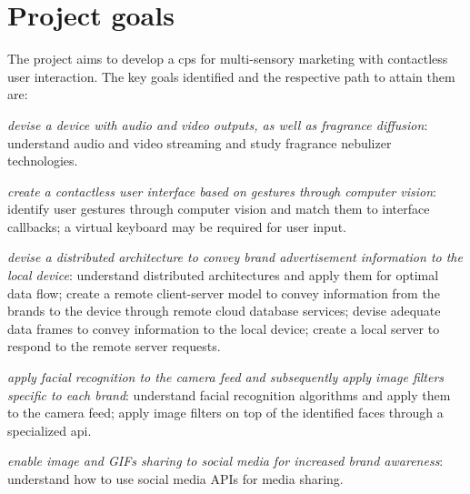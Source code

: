 \section{Project goals}%
\label{sec:project-goals}
The project aims to develop a \gls{cps} for multi-sensory marketing with
contactless user interaction. The key goals identified and the respective path
to attain them are:
\begin{enum-c}
\item \emph{devise a device with audio and video outputs, as well as fragrance
    diffusion}: understand audio and video streaming and study fragrance
  nebulizer technologies.
\item \emph{create a contactless user interface based on gestures through
    computer vision}: identify user gestures through computer vision and match them to interface
  callbacks; a virtual keyboard may be required for user input.
\item \emph{devise a distributed architecture to convey brand advertisement
  information to the local device}: understand distributed architectures and
apply them for optimal data flow; create a remote client-server model to convey
information from the brands to the device through remote cloud database
services; devise adequate data frames to convey information to the local device;
create a local server to respond to the remote server requests.
\item \emph{apply facial recognition to the camera feed and subsequently apply
  image filters specific to each brand}: understand facial recognition
algorithms and apply them to the camera feed; apply image filters on top of the
identified faces through a specialized \gls{api}.
\item \emph{enable image and GIFs sharing to social media for increased brand
    awareness}: understand how to use social media APIs for media sharing.
\end{enum-c}
%
